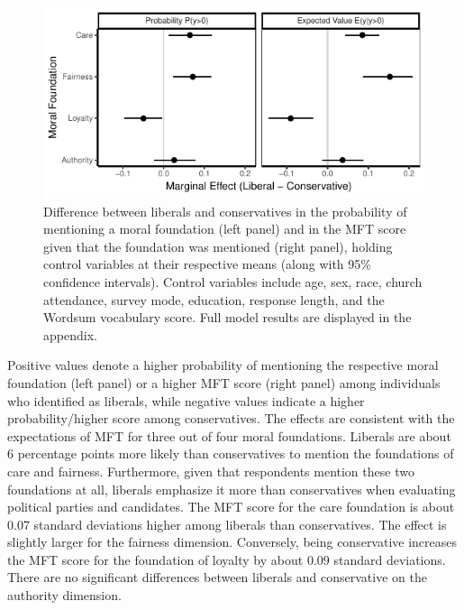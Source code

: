 \documentclass[12pt]{article}
\begin{document}
\begin{figure}[ht]\centering
\includegraphics{../calc/fig/tobit_ideol.pdf}
\caption{Difference between liberals and conservatives in the probability of mentioning a moral foundation (left panel) and in the MFT score given that the foundation was mentioned (right panel), holding control variables at their respective means (along with 95\% confidence intervals). Control variables include age, sex, race, church attendance, survey mode, education, response length, and the Wordsum vocabulary score. Full model results are displayed in the appendix.
}\label{fig:tobit_ideol}
\end{figure}

Positive values denote a higher probability of mentioning the respective moral foundation (left panel) or a higher MFT score (right panel) among individuals who identified as liberals, while negative values indicate a higher probability/higher score among conservatives. The effects are consistent with the expectations of MFT for three out of four moral foundations. Liberals are about 6 percentage points more likely than conservatives to mention the foundations of care and fairness. Furthermore, given that respondents mention these two foundations at all, liberals emphasize it more than conservatives when evaluating political parties and candidates. The MFT score for the care foundation is about 0.07 standard deviations higher among liberals than conservatives. The effect is slightly larger for the fairness dimension. Conversely, being conservative increases the MFT score for the foundation of loyalty by about 0.09 standard deviations. There are no significant differences between liberals and conservative on the authority dimension.

\end{document}
